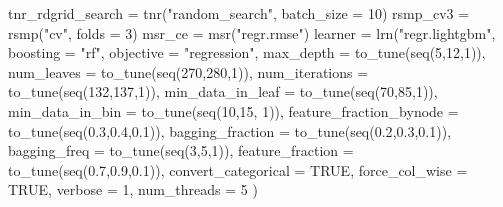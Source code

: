 \documentclass[11pt,a4paper]{article}
\newenvironment{Shaded}{\begin{snugshade}}{\end{snugshade}}
\newcommand{\AttributeTok}[1]{\textcolor[rgb]{0.77,0.63,0.00}{#1}}
\newcommand{\ConstantTok}[1]{\textcolor[rgb]{0.00,0.00,0.00}{#1}}
\newcommand{\DecValTok}[1]{\textcolor[rgb]{0.00,0.00,0.81}{#1}}
\newcommand{\FloatTok}[1]{\textcolor[rgb]{0.00,0.00,0.81}{#1}}
\newcommand{\FunctionTok}[1]{\textcolor[rgb]{0.00,0.00,0.00}{#1}}
\newcommand{\NormalTok}[1]{#1}
\newcommand{\OtherTok}[1]{\textcolor[rgb]{0.56,0.35,0.01}{#1}}
\newcommand{\StringTok}[1]{\textcolor[rgb]{0.31,0.60,0.02}{#1}}
\begin{document}
\begin{Shaded}
\begin{Highlighting}[]
\NormalTok{tnr\_rdgrid\_search }\OtherTok{=} \FunctionTok{tnr}\NormalTok{(}\StringTok{"random\_search"}\NormalTok{, }\AttributeTok{batch\_size =} \DecValTok{10}\NormalTok{)}
\NormalTok{rsmp\_cv3 }\OtherTok{=} \FunctionTok{rsmp}\NormalTok{(}\StringTok{"cv"}\NormalTok{, }\AttributeTok{folds =} \DecValTok{3}\NormalTok{)}
\NormalTok{msr\_ce }\OtherTok{=} \FunctionTok{msr}\NormalTok{(}\StringTok{"regr.rmse"}\NormalTok{)}
\NormalTok{learner }\OtherTok{=} \FunctionTok{lrn}\NormalTok{(}\StringTok{"regr.lightgbm"}\NormalTok{,}
              \AttributeTok{boosting =} \StringTok{"rf"}\NormalTok{,}
              \AttributeTok{objective =} \StringTok{"regression"}\NormalTok{,}
              \AttributeTok{max\_depth =} \FunctionTok{to\_tune}\NormalTok{(}\FunctionTok{seq}\NormalTok{(}\DecValTok{5}\NormalTok{,}\DecValTok{12}\NormalTok{,}\DecValTok{1}\NormalTok{)),}
              \AttributeTok{num\_leaves =} \FunctionTok{to\_tune}\NormalTok{(}\FunctionTok{seq}\NormalTok{(}\DecValTok{270}\NormalTok{,}\DecValTok{280}\NormalTok{,}\DecValTok{1}\NormalTok{)),}
              \AttributeTok{num\_iterations  =} \FunctionTok{to\_tune}\NormalTok{(}\FunctionTok{seq}\NormalTok{(}\DecValTok{132}\NormalTok{,}\DecValTok{137}\NormalTok{,}\DecValTok{1}\NormalTok{)),}
              \AttributeTok{min\_data\_in\_leaf =} \FunctionTok{to\_tune}\NormalTok{(}\FunctionTok{seq}\NormalTok{(}\DecValTok{70}\NormalTok{,}\DecValTok{85}\NormalTok{,}\DecValTok{1}\NormalTok{)),}
              \AttributeTok{min\_data\_in\_bin =} \FunctionTok{to\_tune}\NormalTok{(}\FunctionTok{seq}\NormalTok{(}\DecValTok{10}\NormalTok{,}\DecValTok{15}\NormalTok{, }\DecValTok{1}\NormalTok{)),}
              \AttributeTok{feature\_fraction\_bynode =} \FunctionTok{to\_tune}\NormalTok{(}\FunctionTok{seq}\NormalTok{(}\FloatTok{0.3}\NormalTok{,}\FloatTok{0.4}\NormalTok{,}\FloatTok{0.1}\NormalTok{)),}
              \AttributeTok{bagging\_fraction =} \FunctionTok{to\_tune}\NormalTok{(}\FunctionTok{seq}\NormalTok{(}\FloatTok{0.2}\NormalTok{,}\FloatTok{0.3}\NormalTok{,}\FloatTok{0.1}\NormalTok{)),}
              \AttributeTok{bagging\_freq =} \FunctionTok{to\_tune}\NormalTok{(}\FunctionTok{seq}\NormalTok{(}\DecValTok{3}\NormalTok{,}\DecValTok{5}\NormalTok{,}\DecValTok{1}\NormalTok{)),}
              \AttributeTok{feature\_fraction =} \FunctionTok{to\_tune}\NormalTok{(}\FunctionTok{seq}\NormalTok{(}\FloatTok{0.7}\NormalTok{,}\FloatTok{0.9}\NormalTok{,}\FloatTok{0.1}\NormalTok{)),}
              \AttributeTok{convert\_categorical =} \ConstantTok{TRUE}\NormalTok{,}
              \AttributeTok{force\_col\_wise =} \ConstantTok{TRUE}\NormalTok{,}
              \AttributeTok{verbose =} \DecValTok{1}\NormalTok{,}
              \AttributeTok{num\_threads =} \DecValTok{5}
\NormalTok{)}


\end{Highlighting}
\end{Shaded}
\end{document}
